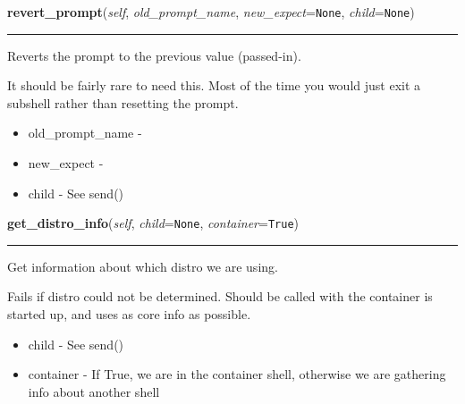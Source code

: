 \hspace{.8\funcindent}\begin{boxedminipage}{\funcwidth}

    \raggedright \textbf{revert\_prompt}(\textit{self}, \textit{old\_prompt\_name}, \textit{new\_expect}={\tt None}, \textit{child}={\tt None})

    \vspace{-1.5ex}

    \rule{\textwidth}{0.5\fboxrule}
\setlength{\parskip}{2ex}
    Reverts the prompt to the previous value (passed-in).

    It should be fairly rare to need this. Most of the time you would just 
    exit a subshell rather than resetting the prompt.

    \begin{itemize}
    \setlength{\parskip}{0.6ex}
      \item old\_prompt\_name -

      \item new\_expect      -

      \item child           - See send()

    \end{itemize}

\setlength{\parskip}{1ex}
    \end{boxedminipage}

    \label{shutit_global:ShutIt:get_distro_info}

    \vspace{0.5ex}

\hspace{.8\funcindent}\begin{boxedminipage}{\funcwidth}

    \raggedright \textbf{get\_distro\_info}(\textit{self}, \textit{child}={\tt None}, \textit{container}={\tt True})

    \vspace{-1.5ex}

    \rule{\textwidth}{0.5\fboxrule}
\setlength{\parskip}{2ex}
    Get information about which distro we are using.

    Fails if distro could not be determined. Should be called with the 
    container is started up, and uses as core info as possible.

    \begin{itemize}
    \setlength{\parskip}{0.6ex}
      \item child              - See send()

      \item container          - If True, we are in the container shell, 
        otherwise we are gathering info about another shell

    \end{itemize}

\setlength{\parskip}{1ex}
    \end{boxedminipage}

